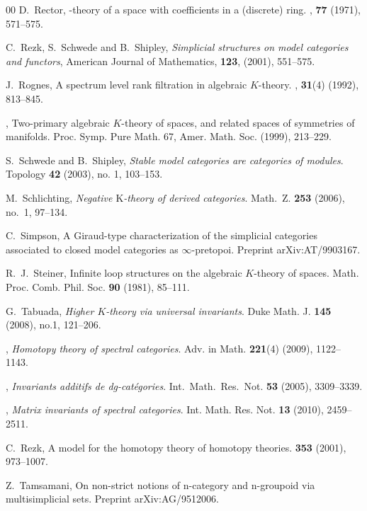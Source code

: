 \documentclass{amsart}
\renewcommand{\i}{\infty}
\numberwithin{equation}{section}
\theoremstyle{definition}
\begin{document}
\begin{thebibliography}{00}
 D.~Rector,
-theory of a space with coefficients in a (discrete)
ring.
, {\bf 77} (1971), 571--575.

 C.~Rezk, S.~Schwede and B.~Shipley,
  {\em Simplicial structures on model categories and functors},
  American Journal of Mathematics, {\bf 123}, (2001), 551--575.

J.~Rognes,
\newblock A spectrum level rank filtration in algebraic {$K$}-theory.
, {\bf 31}(4) (1992), 813--845.

\bysame,
\newblock Two-primary algebraic {$K$}-theory of spaces, and related
spaces of symmetries of manifolds.
\newblock Proc. Symp. Pure Math. 67, Amer. Math. Soc. (1999), 213--229.

 S.~Schwede and B.~Shipley, {\em Stable model categories are
  categories of modules}. Topology {\bf 42} (2003), no. 1, 103--153.

 M.~Schlichting, {\em Negative $\mbox{K}$-theory of
    derived categories}. Math.~Z. {\bf 253} (2006), no.~1, 97--134.

C.~Simpson,
\newblock A Giraud-type characterization of the simplicial categories
associated to closed model categories as $\i$-pretopoi.
\newblock Preprint arXiv:AT/9903167.

 R.~J.~Steiner,
\newblock Infinite loop structures on the algebraic {$K$}-theory of spaces.
\newblock Math. Proc. Comb. Phil. Soc. {\bf 90} (1981), 85--111.

 G.~Tabuada, {\em Higher $K$-theory via universal invariants}.
Duke Math. J. {\bf 145} (2008), no.1, 121--206.

 \bysame, {\em Homotopy theory of spectral categories}. Adv. in Math. {\bf 221}(4) (2009), 1122--1143.

 \bysame, {\em Invariants additifs de dg-cat{\'e}gories}.
Int.~Math.~Res.~Not. {\bf 53} (2005), 3309--3339.

 \bysame, {\em Matrix invariants of spectral
  categories}. Int. Math. Res. Not. {\bf 13} (2010), 2459--2511.

 C.~Rezk,
\newblock A model for the homotopy theory of homotopy theories.
 {\bf 353} (2001), 973--1007.

 Z.~Tamsamani,
\newblock On non-strict notions of n-category and n-groupoid via
multisimplicial sets. 
\newblock Preprint arXiv:AG/9512006.


\end{thebibliography}
\end{document}
